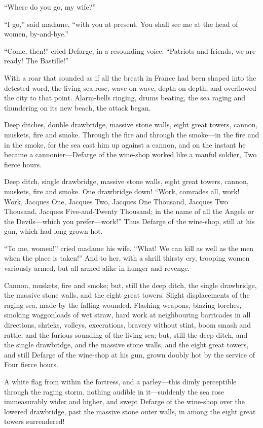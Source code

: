 ``Where do you go, my wife?''

``I go,'' said madame, ``with you at present.  You shall see me at the
head of women, by-and-bye.''

``Come, then!'' cried Defarge, in a resounding voice.  ``Patriots and
friends, we are ready!  The Bastille!''

With a roar that sounded as if all the breath in France had been
shaped into the detested word, the living sea rose, wave on wave,
depth on depth, and overflowed the city to that point.  Alarm-bells
ringing, drums beating, the sea raging and thundering on its new beach,
the attack began.

Deep ditches, double drawbridge, massive stone walls, eight great
towers, cannon, muskets, fire and smoke.  Through the fire and through
the smoke---in the fire and in the smoke, for the sea cast him up against
a cannon, and on the instant he became a cannonier---Defarge of the
wine-shop worked like a manful soldier, Two fierce hours.

Deep ditch, single drawbridge, massive stone walls, eight great towers,
cannon, muskets, fire and smoke.  One drawbridge down!  ``Work, comrades
all, work!  Work, Jacques One, Jacques Two, Jacques One Thousand,
Jacques Two Thousand, Jacques Five-and-Twenty Thousand; in the name of
all the Angels or the Devils---which you prefer---work!''  Thus Defarge
of the wine-shop, still at his gun, which had long grown hot.

``To me, women!'' cried madame his wife.  ``What!  We can kill as well as
the men when the place is taken!''  And to her, with a shrill thirsty cry,
trooping women variously armed, but all armed alike in hunger and revenge.

Cannon, muskets, fire and smoke; but, still the deep ditch, the single
drawbridge, the massive stone walls, and the eight great towers.  Slight
displacements of the raging sea, made by the falling wounded.  Flashing
weapons, blazing torches, smoking waggonloads of wet straw, hard work
at neighbouring barricades in all directions, shrieks, volleys,
execrations, bravery without stint, boom smash and rattle, and the
furious sounding of the living sea; but, still the deep ditch, and the
single drawbridge, and the massive stone walls, and the eight great
towers, and still Defarge of the wine-shop at his gun, grown doubly
hot by the service of Four fierce hours.

A white flag from within the fortress, and a parley---this dimly
perceptible through the raging storm, nothing audible in it---suddenly
the sea rose immeasurably wider and higher, and swept Defarge of the
wine-shop over the lowered drawbridge, past the massive stone outer
walls, in among the eight great towers surrendered!

